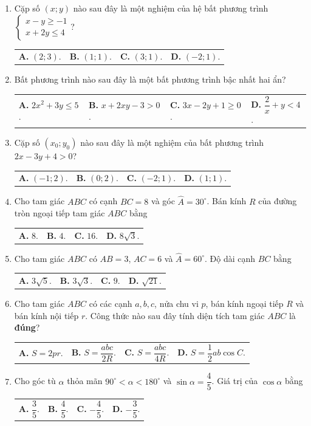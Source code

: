 \documentclass[12pt,a4paper]{article}
\makeatletter
\newcommand{\four}[4]{\par\noindent\begin{tabularx}{\linewidth}{@{}*{4}{>{\raggedright\arraybackslash}X}@{}}\textbf{A.} #1&\textbf{B.} #2&\textbf{C.} #3&\textbf{D.} #4\end{tabularx}}
\makeatother
\begin{document}
\begin{enumerate}
\item Cặp số $(x; y)$ nào sau đây là một nghiệm của hệ bất phương trình $\begin{cases} x - y \ge -1 \\ x + 2y \le 4 \end{cases}$?
\four{$(2; 3)$.}{$(1; 1)$.}{$(3; 1)$.}{$(-2; 1)$.}

\item Bất phương trình nào sau đây là một bất phương trình bậc nhất hai ẩn?
\four{$2x^2 + 3y \le 5$.}{$x + 2xy - 3 > 0$.}{$3x - 2y + 1 \ge 0$.}{$\dfrac{2}{x} + y < 4$.}

\item Cặp số $(x_0; y_0)$ nào sau đây là một nghiệm của bất phương trình $2x - 3y + 4 > 0$?
\four{$(-1; 2)$.}{$(0; 2)$.}{$(-2; 1)$.}{$(1; 1)$.}

\item Cho tam giác $ABC$ có cạnh $BC = 8$ và góc $\widehat{A} = 30^\circ$. Bán kính $R$ của đường tròn ngoại tiếp tam giác $ABC$ bằng
\four{$8$.}{$4$.}{$16$.}{$8\sqrt{3}$.}

\item Cho tam giác $ABC$ có $AB = 3$, $AC = 6$ và $\widehat{A} = 60^\circ$. Độ dài cạnh $BC$ bằng
\four{$3\sqrt{5}$.}{$3\sqrt{3}$.}{$9$.}{$\sqrt{21}$.}

\item Cho tam giác $ABC$ có các cạnh $a, b, c$, nửa chu vi $p$, bán kính ngoại tiếp $R$ và bán kính nội tiếp $r$. Công thức nào sau đây tính diện tích tam giác $ABC$ là \textbf{đúng}?
\four{$S = 2pr$.}{$S = \dfrac{abc}{2R}$.}{$S = \dfrac{abc}{4R}$.}{$S = \dfrac{1}{2}ab \cos C$.}

\item Cho góc tù $\alpha$ thỏa mãn $90^\circ < \alpha < 180^\circ$ và $\sin \alpha = \dfrac{4}{5}$. Giá trị của $\cos \alpha$ bằng
\four{$\dfrac{3}{5}$.}{$\dfrac{4}{5}$.}{$-\dfrac{4}{5}$.}{$-\dfrac{3}{5}$.}
\end{enumerate}
\end{document}
